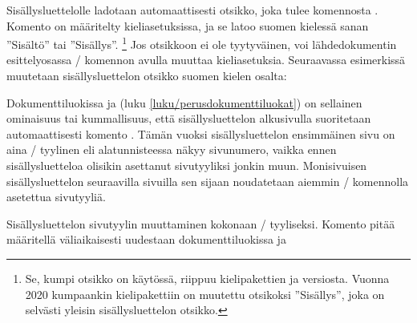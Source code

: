 \begin{koodilohkosis}
\setcounter{tocdepth}{0}
\end{koodilohkosis}

\noindent
Sisällysluettelolle ladotaan automaattisesti otsikko, joka tulee
komennosta . Komento on määritelty
kieliasetuksissa, ja se latoo suomen kielessä sanan ''Sisältö'' tai
''Sisällys''.%
\footnote{Se, kumpi otsikko on käytössä, riippuu kielipakettien
   ja  versiosta. Vuonna 2020
  kumpaankin kielipakettiin on muutettu otsikoksi ''Sisällys'', joka on
  selvästi yleisin sisällysluettelon otsikko.} Jos otsikkoon ei ole
tyytyväinen, voi lähdedokumentin esittelyosassa \-/
komennon avulla muuttaa kieliasetuksia. Seuraavassa esimerkissä
muutetaan sisällysluettelon otsikko suomen kielen osalta:

\begin{koodilohkosis}
\addto{\captionsfinnish}{
  \renewcommand{\contentsname}{Sisällysluettelo}
}
\end{koodilohkosis}

\noindent
Dokumenttiluokissa  ja  (luku
\ref{luku/perusdokumenttiluokat}) on sellainen ominaisuus tai
kummallisuus, että sisällysluettelon alkusivulla suoritetaan
automaattisesti komento . Tämän
vuoksi sisällysluettelon ensimmäinen sivu on aina \-/
tyylinen eli alatunnisteessa näkyy sivunumero, vaikka ennen
sisällysluetteloa olisikin asettanut sivutyyliksi jonkin muun.
Monisivuisen sisällysluettelon seuraavilla sivuilla sen sijaan
noudatetaan aiemmin \-/ komennolla asetettua
sivutyyliä.

\begin{esimerkki*}

\begin{koodilohko}
\pagestyle{empty}
{
  \renewcommand{\thispagestyle}[1]{} %
  \tableofcontents
}
\end{koodilohko}
  \caption{Sisällysluettelon sivutyylin muuttaminen kokonaan
    \-/ tyyliseksi. Komento  pitää
    määritellä väliaikaisesti uudestaan dokumenttiluokissa 
    ja }
  \label{esim/sisällysluettelo-empty}
\end{esimerkki*}


